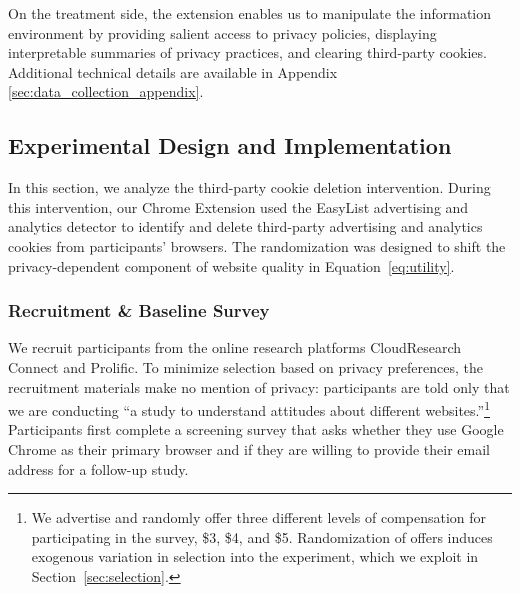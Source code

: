 \documentclass[12pt]{article}
\theoremstyle{definition}
\theoremstyle{remark}
\begin{document}
On the treatment side, the extension enables us to manipulate the information environment by providing salient access to privacy policies, displaying interpretable summaries of privacy practices, and clearing third-party cookies. Additional technical details are available in Appendix \ref{sec:data_collection_appendix}.

\subsection{Experimental Design and Implementation}

In this section, we analyze the third-party cookie deletion intervention. During this intervention, our Chrome Extension used the EasyList advertising and analytics detector to identify and delete third-party advertising and analytics cookies from participants' browsers. The randomization was designed to shift the privacy-dependent component of website quality in Equation~\eqref{eq:utility}.

\subsubsection{Recruitment \& Baseline Survey}\label{subsec:recruitment}

We recruit participants from the online research platforms CloudResearch Connect and Prolific. To minimize selection based on privacy preferences, the recruitment materials make no mention of privacy: participants are told only that we are conducting ``a study to understand attitudes about different websites.''\footnote{We advertise and randomly offer three different levels of compensation for participating in the survey, \$3, \$4, and \$5. Randomization of offers induces exogenous variation in selection into the experiment, which we exploit in Section~\ref{sec:selection}.} Participants first complete a screening survey that asks whether they use Google Chrome as their primary browser and if they are willing to provide their email address for a follow-up study.
\end{document}
